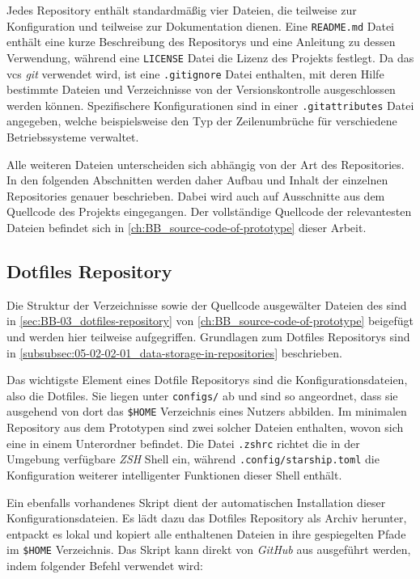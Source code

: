 Jedes Repository enthält standardmäßig vier Dateien, die teilweise zur Konfiguration und teilweise zur Dokumentation dienen. Eine \texttt{README.md} Datei enthält eine kurze Beschreibung des Repositorys und eine Anleitung zu dessen Verwendung, während eine \texttt{LICENSE} Datei die Lizenz des Projekts festlegt. Da das \Gls{vcs} \textit{\Gls{git}} verwendet wird, ist eine \texttt{.gitignore} Datei enthalten, mit deren Hilfe bestimmte Dateien und Verzeichnisse von der Versionskontrolle ausgeschlossen werden können. Spezifischere Konfigurationen sind in einer \texttt{.gitattributes} Datei angegeben, welche beispielsweise den Typ der Zeilenumbrüche für verschiedene Betriebssysteme verwaltet.

Alle weiteren Dateien unterscheiden sich abhängig von der Art des Repositories. In den folgenden Abschnitten werden daher Aufbau und Inhalt der einzelnen Repositories genauer beschrieben. Dabei wird auch auf Ausschnitte aus dem Quellcode des Projekts eingegangen. Der vollständige Quellcode der relevantesten Dateien befindet sich in \autoref{ch:BB_source-code-of-prototype} dieser Arbeit.

\subsection{Dotfiles Repository}
\label{subsec:06-02-01_dotfiles-repository}

Die Struktur der Verzeichnisse sowie der Quellcode ausgewälter Dateien des  sind in \autoref{sec:BB-03_dotfiles-repository} von \autoref{ch:BB_source-code-of-prototype} beigefügt und werden hier teilweise aufgegriffen. Grundlagen zum Dotfiles Repositorys sind in \autoref{subsubsec:05-02-02-01_data-storage-in-repositories} beschrieben.

Das wichtigste Element eines Dotfile Repositorys sind die Konfigurationsdateien, also die Dotfiles. Sie liegen unter \texttt{configs/} ab und sind so angeordnet, dass sie ausgehend von dort das \texttt{\$HOME} Verzeichnis eines Nutzers abbilden. Im minimalen Repository aus dem Prototypen sind zwei solcher Dateien enthalten, wovon sich eine in einem Unterordner befindet. Die Datei \texttt{.zshrc} richtet die in der Umgebung verfügbare \textit{ZSH} Shell ein, während \texttt{.config/starship.toml} die Konfiguration weiterer intelligenter Funktionen dieser Shell enthält.

Ein ebenfalls vorhandenes Skript  dient der automatischen Installation dieser Konfigurationsdateien. Es lädt dazu das Dotfiles Repository als Archiv herunter, entpackt es lokal und kopiert alle enthaltenen Dateien in ihre gespiegelten Pfade im \texttt{\$HOME} Verzeichnis. Das Skript kann direkt von \textit{GitHub} aus ausgeführt werden, indem folgender Befehl verwendet wird:

